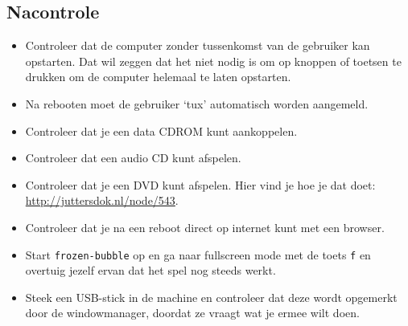 \subsection{Nacontrole}
\begin{itemize}
	\item Controleer dat de computer zonder tussenkomst van de gebruiker kan opstarten. Dat wil zeggen dat het niet nodig is om op knoppen of toetsen te drukken om de computer helemaal te laten opstarten.
	\item Na rebooten moet de gebruiker `tux' automatisch worden aangemeld.
	\item Controleer dat je een data CDROM kunt aankoppelen.
  \item Controleer dat een audio CD kunt afspelen.
  \item Controleer dat je een DVD kunt afspelen. Hier vind je hoe je dat doet:\\ \url{http://juttersdok.nl/node/543}.
	\item Controleer dat je na een reboot direct op internet kunt met een browser.
	\item Start \texttt{frozen-bubble} op en ga naar fullscreen mode met de toets \texttt{f} en overtuig jezelf ervan dat het spel nog steeds werkt.
  \item Steek een USB-stick in de machine en controleer dat deze wordt opgemerkt door de windowmanager, doordat ze vraagt wat je ermee wilt doen.
\end{itemize}
